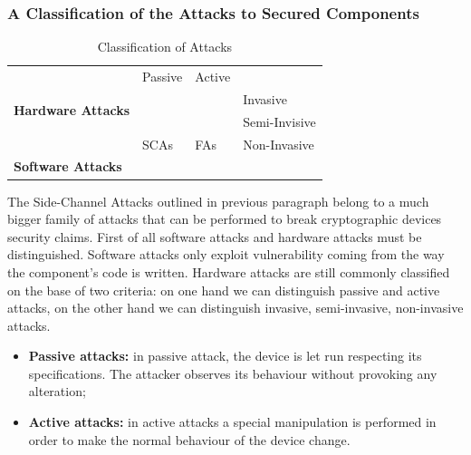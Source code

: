 \subsubsection{A Classification of the Attacks to Secured Components}
\begin{table}[]
\centering
\caption{Classification of Attacks}
\label{fig:classification_attacks}
\begin{tabular}{|l|lll}
\cline{1-3}
\multirow{4}{*}{\textbf{Hardware Attacks}} & \multicolumn{1}{l|}{Passive} & \multicolumn{1}{l|}{Active} &                                    \\ \cline{2-4} 
                                           & \multicolumn{1}{l|}{}        & \multicolumn{1}{l|}{}       & \multicolumn{1}{l|}{Invasive}      \\ \cline{2-4} 
                                           & \multicolumn{1}{l|}{}        & \multicolumn{1}{l|}{}       & \multicolumn{1}{l|}{Semi-Invisive} \\ \cline{2-4} 
                                           & \multicolumn{1}{l|}{SCAs}    & \multicolumn{1}{l|}{FAs}    & \multicolumn{1}{l|}{Non-Invasive}  \\ \hline
\textbf{Software Attacks}                  &                              &                             &                                    \\ \cline{1-1}
\end{tabular}
\end{table}

The Side-Channel Attacks outlined in previous paragraph belong to a much bigger family of attacks that can be performed to break cryptographic devices security claims. First of all software attacks and hardware attacks must be distinguished. Software attacks only exploit vulnerability coming from the way the component's code is written. Hardware attacks are still commonly classified on the base of two criteria: on one hand we can distinguish passive and active attacks, on the other hand we can distinguish invasive, semi-invasive, non-invasive attacks. 
\begin{itemize}
\item[] \textbf{Passive attacks:} in passive attack, the device is let run respecting its specifications. The attacker observes its behaviour without provoking any alteration;
\item[] \textbf{Active attacks:}  in active attacks a special manipulation is performed in order to make the normal behaviour of the device change. 
\end{itemize}



